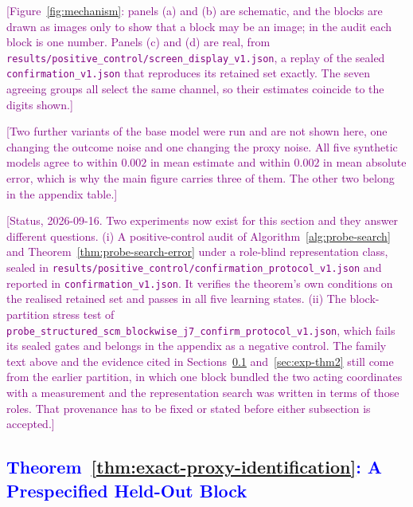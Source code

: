 \textcolor{purple}{[Figure~\ref{fig:mechanism}: panels (a) and (b) are schematic, and the blocks are drawn as images only to show that a block may be an image; in the audit each block is one number. Panels (c) and (d) are real, from \texttt{results/positive\_control/screen\_display\_v1.json}, a replay of the sealed \texttt{confirmation\_v1.json} that reproduces its retained set exactly. The seven agreeing groups all select the same channel, so their estimates coincide to the digits shown.]}

\textcolor{purple}{[Two further variants of the base model were run and are not shown here, one changing the outcome noise and one changing the proxy noise. All five synthetic models agree to within $0.002$ in mean estimate and within $0.002$ in mean absolute error, which is why the main figure carries three of them. The other two belong in the appendix table.]}

\textcolor{purple}{[Status, 2026-09-16. Two experiments now exist for this section and they answer different questions. (i) A positive-control audit of Algorithm~\ref{alg:probe-search} and Theorem~\ref{thm:probe-search-error} under a role-blind representation class, sealed in \texttt{results/positive\_control/confirmation\_protocol\_v1.json} and reported in \texttt{confirmation\_v1.json}. It verifies the theorem's own conditions on the realised retained set and passes in all five learning states. (ii) The block-partition stress test of \texttt{probe\_structured\_scm\_blockwise\_j7\_confirm\_protocol\_v1.json}, which fails its sealed gates and belongs in the appendix as a negative control. The family text above and the evidence cited in Sections~\ref{sec:exp-thm1} and~\ref{sec:exp-thm2} still come from the earlier partition, in which one block bundled the two acting coordinates with a measurement and the representation search was written in terms of those roles. That provenance has to be fixed or stated before either subsection is accepted.]}

\subsection{\texorpdfstring{\textcolor{blue}{Theorem~\ref{thm:exact-proxy-identification}: A Prespecified Held-Out Block}}{Theorem 1: A Prespecified Held-Out Block}}
\label{sec:exp-thm1}


